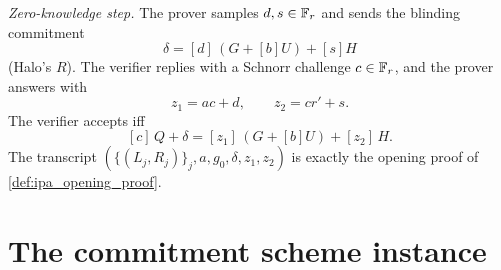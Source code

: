 \begin{definition}
  \emph{Zero-knowledge step.} The prover samples \(d, s \in \mathbb{F}_r\) and sends the
  blinding commitment
  \[
    \delta = [d]\,(G + [b]U) + [s]H
  \]
  (Halo's \(R\)). The verifier replies with a Schnorr challenge \(c \in \mathbb{F}_r\),
  and the prover answers with
  \[
    z_{1} = a c + d, \qquad z_{2} = c r' + s.
  \]
  The verifier accepts iff
  \[
    [c]\,Q + \delta = [z_{1}]\,(G + [b]U) + [z_{2}]\,H.
  \]
  The transcript \((\{(L_{j}, R_{j})\}_{j}, a, g_{0}, \delta, z_{1}, z_{2})\) is
  exactly the opening proof of \cref{def:ipa_opening_proof}.
\end{definition}

\section{The commitment scheme instance}

